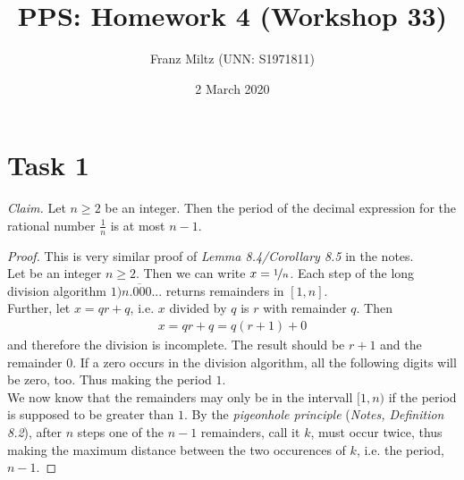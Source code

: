 \documentclass{article}
\title{PPS: Homework 4 (Workshop 33)}
\author{Franz Miltz (UNN: S1971811)}
\date{2 March 2020}
\begin{document}
\maketitle
\section*{Task 1}
\emph{Claim.} Let $n\geq 2$ be an integer. Then the period of the decimal expression for the rational number $\frac{1}{n}$ is at most $n-1$.
\begin{proof}
  This is very similar proof of \emph{Lemma 8.4/Corollary 8.5} in the notes.\\
  Let be an integer $n\geq 2$. Then we can write $x=\nicefrac{1}{n}$. Each step of the long division algorithm $1\overline{)n.000...}$ returns remainders in $[1,n]$.\\
  Further, let $x=qr+q$, i.e. $x$ divided by $q$ is $r$ with remainder $q$. Then
  \begin{align*}
    x = qr+q = q(r+1)+0
  \end{align*}
  and therefore the division is incomplete. The result should be $r+1$ and the remainder $0$. If a zero occurs in the division algorithm, all the following digits will be zero, too. Thus making the period $1$.\\
  We now know that the remainders may only be in the intervall $[1, n)$ if the period is supposed to be greater than $1$. By the \emph{pigeonhole principle} (\emph{Notes, Definition 8.2}), after $n$ steps one of the $n-1$ remainders, call it $k$, must occur twice, thus making the maximum distance between the two occurences of $k$, i.e. the period, $n-1$.

\end{proof}
\end{document}
